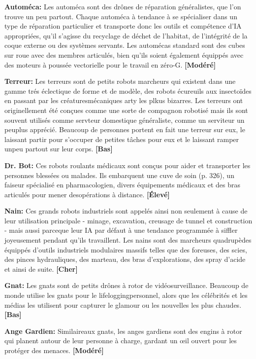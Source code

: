 \textbf{Automéca:} Les automéca sont des drônes de réparation généralistes, que l'on trouve un peu partout. Chaque automéca à tendance à se spécialiser dans un type de réparation particulier et transporte donc les outils et compétence d'IA appropriées, qu'il s'agisse du recyclage de déchet de l'habitat, de l'intégrité de la coque externe ou des systèmes servants. Les automécas standard sont des cubes sur roue avec des membres articulés, bien qu'ils soient également équippés avec des moteurs à poussée vectorielle pour le travail en zéro-G. \textbf{[Modéré]} 

\textbf{Terreur:} Les terreurs sont de petits robots marcheurs qui existent dans une gamme trés éclectique de forme et de modèle, des robots écureuils aux insectoïdes en passant par les créaturesmécaniques arty les plkus bizarres. Les terreurs ont originellement été conçues comme une sorte de compagnon robotisé mais ils sont souvent utilisés comme servteur domestique généraliste, comme un serviteur un peuplus apprécié. Beaucoup de personnes portent en fait une terreur sur eux, le laissant partir pour s'occuper de petites tâches pour eux et le laissant ramper unpeu partout sur leur corps. \textbf{[Bas]} 

\textbf{Dr. Bot:} Ces robots roulants médicaux sont conçus pour aider et transporter les personnes blessées ou malades. Ils embarquent une cuve de soin (p. 326), un faiseur spécialisé en pharmacologien, divers équipements médicaux et des bras articulés pour mener desopérations à distance. \textbf{[Élevé]} 

\textbf{Nain:} Ces grands robots industriels sont appelés ainsi non seulement à cause de leur utilisation principale - minage, excavation, creusage de tunnel et construction - mais aussi parceque leur IA par défaut à une tendance programmée à siffler joyeusement pendant qu'ils travaillent. Les nains sont des marcheurs quadrupèdes équippés d'outils industriels modulaires massifs telles que des foreuses, des scies, des pinces hydrauliques, des marteau, des bras d'explorations, des spray d'acide et ainsi de suite. \textbf{[Cher]} 

\textbf{Gnat:} Les gnats sont de petits drônes à rotor de vidéosurveillance. Beaucoup de monde utilise les gnats pour le lifeloggingpersonnel, alors que les célébrités et les médias les utilisent pour capturer le glamour ou les nouvelles les plus chaudes. \textbf{[Bas]} 

\textbf{Ange Gardien:} Similaireaux gnats, les anges gardiens sont des engins à rotor qui planent autour de leur personne à charge, gardant un œil ouvert pour les protéger des menaces. \textbf{[Modéré]} 

